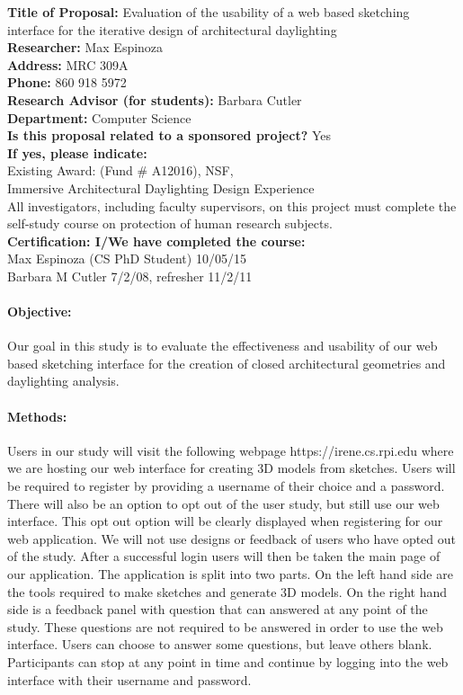 \documentclass[12pt]{article}
\begin{document}
\noindent
{\bf Title of Proposal:} Evaluation of the usability of a web based 
sketching interface for the iterative design of architectural daylighting \\
{\bf Researcher:}   Max Espinoza\\
{\bf Address:}  MRC 309A\\
{\bf Phone:} 860 918 5972\\ 
{\bf Research Advisor (for students):}  Barbara Cutler \\
{\bf Department:}  Computer Science \\
{\bf Is this proposal related to a sponsored project?}  Yes \\
{\bf If yes,  please indicate:}  \\
Existing Award: (Fund \# A12016), NSF, \\
Immersive Architectural Daylighting Design Experience \\

\noindent
All investigators, including faculty supervisors, on this project must
complete the self-study course on protection of human research
subjects. \\
{\bf Certification:  I/We have completed the course:} \\
Max Espinoza (CS PhD Student) 10/05/15 \\ %
Barbara M Cutler 7/2/08, refresher 11/2/11

\paragraph{Objective:}
%
Our goal in this study is to evaluate the effectiveness and usability of 
our web based sketching interface for the creation of closed architectural 
geometries and daylighting analysis.

\paragraph{Methods:}
%
Users in our study will visit the following webpage https://irene.cs.rpi.edu where we are 
hosting our web interface for creating 3D models from sketches.
Users will be required to register by providing a username of their choice and a password.
There will also be an option to opt out of the user study, but still use our web interface. 
This opt out option will be clearly displayed when registering for our web application.
We will not use designs or feedback of users who have opted out of the study.
After a successful login users will then be taken the main page of our application.
The application is split into two parts. On the left hand side are the tools required to
make sketches and generate 3D models. On the right hand side is a feedback panel with question 
that can answered at any point of the study. These questions are not required to be answered in order
to use the web interface. Users can choose to answer some questions, but leave others blank.
Participants can stop at any point in time and continue by logging into the web interface
with their username and password.\\
\end{document}
